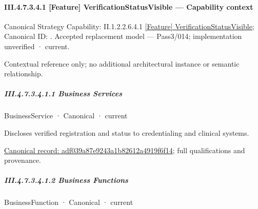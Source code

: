 \paragraph*{III.4.7.3.4.1 [Feature] VerificationStatusVisible — Capability context}
\label{navigation:III.4.7.3.4.1}

{\small Canonical Strategy Capability: II.1.2.2.6.4.1 \hyperref[element:2275144b93364b2ca3f2368b69e1ce80]{[Feature] VerificationStatusVisible}; Canonical ID: \texttt{}. Accepted replacement model — Pass3/014; implementation unverified · current.}\par
Contextual reference only; no additional architectural instance or semantic relationship.\par
\subparagraph*{III.4.7.3.4.1.1 Business Services}
\label{navigation:III.4.7.3.4.1.1}

\label{navigation:III.4.7.3.4.1.1.1}

\label{element:adf039a87e9243a1b82612a4919f6f14}
{\small BusinessService · Canonical · current}\par

Discloses verified registration and status to credentialing and clinical systems.


{\footnotesize \href{../../../../continuum/business/business-service/adf039a87e9243a1b82612a4919f6f14.md}{Canonical record: adf039a87e9243a1b82612a4919f6f14}; full qualifications and provenance.}\par
\subparagraph*{III.4.7.3.4.1.2 Business Functions}
\label{navigation:III.4.7.3.4.1.2}

\label{navigation:III.4.7.3.4.1.2.1}

\label{element:a9f4fe6090bf4a4b946ae7064213945c}
{\small BusinessFunction · Canonical · current}\par

